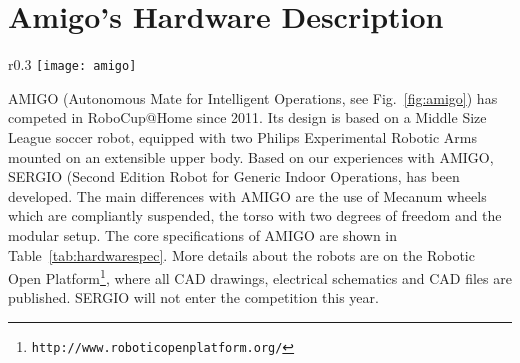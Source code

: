 \section*{Amigo's Hardware Description}

\setlength\intextsep{0pt}
\begin{wrapfigure}[15]{r}{0.3\textwidth}
	\centering
	\texttt{[image: amigo]}
	\caption{The Amigo Robot}
	\label{fig:amigo}
\end{wrapfigure}

AMIGO (Autonomous Mate for Intelligent Operations, see Fig.~\ref{fig:amigo}) has competed in RoboCup@Home since 2011. Its design is based on a Middle Size League soccer robot, equipped with two Philips\texttrademark \hspace{0em} Experimental Robotic Arms mounted on an extensible upper body. Based on our experiences with AMIGO, SERGIO (Second Edition Robot for Generic Indoor Operations, has been developed. The main differences with AMIGO are the use of Mecanum wheels which are compliantly suspended, the torso with two degrees of freedom and the modular setup. The core specifications of AMIGO are shown in Table~\ref{tab:hardwarespec}. More details about the robots are on the Robotic Open Platform\footnote{\texttt{http://www.roboticopenplatform.org/}}, where all CAD drawings, electrical schematics and CAD files are published. SERGIO will not enter the competition this year. \\

